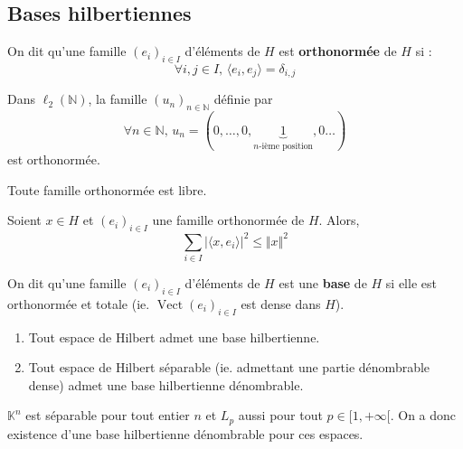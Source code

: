   \subsection{Bases hilbertiennes}


  \begin{definition}
    On dit qu'une famille $(e_i)_{i \in I}$ d'éléments de $H$ est \textbf{orthonormée} de $H$ si :
    \[ \forall i, j \in I, \, \langle e_i, e_j \rangle = \delta_{i,j} \]
  \end{definition}

  \begin{example}
    Dans $\ell_2(\mathbb{N})$, la famille $(u_n)_{n \in \mathbb{N}}$ définie par
    \[ \forall n \in \mathbb{N}, \, u_n = (0, \dots, 0, \underbrace{1}_{n \text{-ième position}}, 0 \dots) \]
    est orthonormée.
  \end{example}

  \begin{proposition}
    Toute famille orthonormée est libre.
  \end{proposition}

  \begin{proposition}
    Soient $x \in H$ et $(e_i)_{i \in I}$ une famille orthonormée de $H$. Alors,
    \[ \sum_{i \in I} \vert \langle x, e_i \rangle \vert^2 \leq \Vert x \Vert^2 \]
  \end{proposition}

  \begin{definition}
    On dit qu'une famille $(e_i)_{i \in I}$ d'éléments de $H$ est une \textbf{base} de $H$ si elle est orthonormée et totale (ie. $\operatorname{Vect}(e_i)_{i \in I}$ est dense dans $H$).
  \end{definition}


  \begin{theorem}
    \begin{enumerate}[label={\bfseries(\roman*)}]
      \item Tout espace de Hilbert admet une base hilbertienne.
      \item Tout espace de Hilbert séparable (ie. admettant une partie dénombrable dense) admet une base hilbertienne dénombrable.
    \end{enumerate}
  \end{theorem}

  \begin{example}
    $\mathbb{K}^n$ est séparable pour tout entier $n$ et $L_p$ aussi pour tout $p \in [1,+\infty[$. On a donc existence d'une base hilbertienne dénombrable pour ces espaces.
  \end{example}

